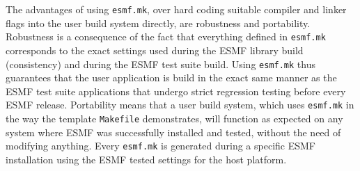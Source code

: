 The advantages of using {\tt esmf.mk}, over hard coding suitable compiler and 
linker flags into the user build system directly, are robustness and portability. 
Robustness is a consequence of the fact that everything defined in {\tt esmf.mk} 
corresponds to the exact settings used during the ESMF library build 
(consistency) and during the ESMF test suite build. Using {\tt esmf.mk} thus 
guarantees that the user application is build in the exact same manner as the 
ESMF test suite applications that undergo strict regression testing before every 
ESMF release. Portability means that a user build system, which uses 
{\tt esmf.mk} in the way the template {\tt Makefile} demonstrates, will function 
as expected on any system where ESMF was successfully installed and tested, 
without the need of modifying anything. Every {\tt esmf.mk} is generated during 
a specific ESMF installation using the ESMF tested settings for the host 
platform.

